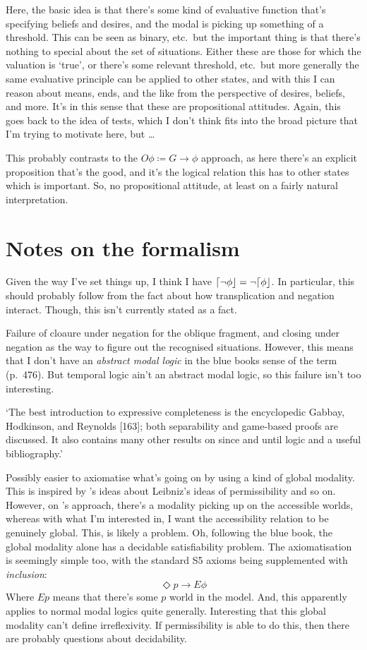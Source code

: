 \documentclass[10pt]{article}
\begin{document}
Here, the basic idea is that there's some kind of evaluative function that's specifying beliefs and desires, and the modal is picking up something of a threshold.
This can be seen as binary, etc.\ but the important thing is that there's nothing to special about the set of situations.
Either these are those for which the valuation is `true', or there's some relevant threshold, etc.\ but more generally the same evaluative principle can be applied to other states, and with this I can reason about means, ends, and the like from the perspective of desires, beliefs, and more.
It's in this sense that these are propositional attitudes.
Again, this goes back to the idea of tests, which I don't think fits into the broad picture that I'm trying to motivate here, but \dots

This probably contrasts to the \(O\phi \coloneq G \rightarrow \phi\) approach, as here there's an explicit proposition that's the good, and it's the logical relation this has to other states which is important.
So, no propositional attitude, at least on a fairly natural interpretation.


\section{Notes on the formalism}
\label{sec:notes-formalism}

Given the way I've set things up, I think I have \(\mathord{\lceil{\lnot\phi}\rfloor} = \lnot\mathord{\lceil{\phi}\rfloor}\).
In particular, this should probably follow from the fact about how transplication and negation interact.
Though, this isn't currently stated as a fact.

Failure of cloaure under negation for the oblique fragment, and closing under negation as the way to figure out the recognised situations.
However, this means that I don't have an \emph{abstract modal logic} in the blue books sense of the term (p.\  476).
But temporal logic ain't an abstract modal logic, so this failure isn't too interesting.

`The best introduction to expressive completeness is the encyclopedic Gabbay, Hodkinson, and Reynolds [163]; both separability and game-based proofs are discussed. It also contains many other results on since and until logic and a useful bibliography.'

Possibly easier to axiomatise what's going on by using a kind of global modality.
This is inspired by \citeauthor{van-Benthem:1979aa}'s ideas about Leibniz's ideas of permissibility and so on.
However, on \citeauthor{van-Benthem:1979aa}'s approach, there's a modality picking up on the accessible worlds, whereas with what I'm interested in, I want the accessibility relation to be genuinely global.
This, is likely a problem.
Oh, following the blue book, the global modality alone has a decidable satisfiability problem.
The axiomatisation is seemingly simple too, with the standard S5 axioms being supplemented with \emph{inclusion}:
\[\Diamond p \rightarrow E\phi\]
Where \(Ep\) means that there's some \(p\) world in the model.
And, this apparently applies to normal modal logics quite generally.
Interesting that this global modality can't define irreflexivity.
If permissibility is able to do this, then there are probably questions about decidability.
\end{document}

